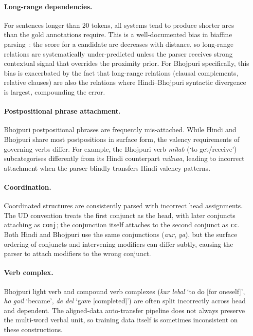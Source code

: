 \documentclass[12pt,a4paper,oneside]{report}
\begin{document}
\paragraph{Long-range dependencies.}
For sentences longer than 20 tokens, all systems tend to produce shorter arcs
than the gold annotations require. This is a well-documented bias in biaffine
parsing~\citep{dozat2017biaffine}: the score for a candidate arc decreases with
distance, so long-range relations are systematically under-predicted unless the
parser receives strong contextual signal that overrides the proximity prior.
For Bhojpuri specifically, this bias is exacerbated by the fact that long-range
relations (clausal complements, relative clauses) are also the relations where
Hindi--Bhojpuri syntactic divergence is largest, compounding the error.

\paragraph{Postpositional phrase attachment.}
Bhojpuri postpositional phrases are frequently mis-attached. While Hindi and
Bhojpuri share most postpositions in surface form, the valency requirements of
governing verbs differ. For example, the Bhojpuri verb \textit{milab} (`to
get/receive') subcategorises differently from its Hindi counterpart
\textit{milnaa}, leading to incorrect attachment when the parser blindly
transfers Hindi valency patterns.

\paragraph{Coordination.}
Coordinated structures are consistently parsed with incorrect head assignments.
The UD convention treats the first conjunct as the head, with later conjuncts
attaching as \texttt{conj}; the conjunction itself attaches to the second
conjunct as \texttt{cc}. Both Hindi and Bhojpuri use the same conjunctions
(\textit{aur}, \textit{ya}), but the surface ordering of conjuncts and
intervening modifiers can differ subtly, causing the parser to attach
modifiers to the wrong conjunct.

\paragraph{Verb complex.}
Bhojpuri light verb and compound verb complexes (\textit{kar lebal} `to do
[for oneself]', \textit{ho gail} `became', \textit{de del} `gave [completed]')
are often split incorrectly across head and dependent. The aligned-data
auto-transfer pipeline does not always preserve the multi-word verbal unit, so
training data itself is sometimes inconsistent on these constructions.
\end{document}
